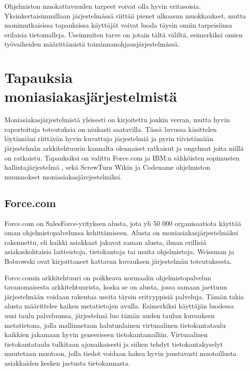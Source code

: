 Ohjelmiston muokattavuuden tarpeet voivat olla hyvin eritasoisia. Yksinkertaisimmillaan järjestelmässä riittää pienet ulkoasun muokkaukset, mutta monimutkaisissa tapauksissa käyttäjät voivat luoda täysin omiin tarpeisiinsa erilaisia tietomalleja. Useimmiten tarve on jotain tältä väliltä, esimerkiksi omien työvaiheiden määrittämistä toiminnanohjausjärjestelmässä.

\chapter{Tapauksia moniasiakasjärjestelmistä}
Moniasiakasjärjestelmistä yleisesti on kirjoitettu jonkin verran, mutta hyvin raportoituja toteutuksia on niukasti saatavilla. Tässä luvussa käsittelen löytämiäni riittävän hyvin kuvattuja järjestelmiä ja pyrin tiivistämään järjestelmän arkkitehtuurin kannalta olennaiset ratkaisut ja ongelmat joita niillä on ratkaistu. Tapauksiksi on valittu Force.com \cite{weissman2009design} ja IBM:n sähköisten sopimusten hallintajärjestelmä \cite{kwok2008software}, sekä ScrewTurn Wikin \cite{bezemer2010challenges} ja Codename ohjelmiston \cite{bezemer2010enabling} muunnokset moniasiakasjärejestelmiksi.


\section{Force.com}
Force.com on SalesForce-yrityksen alusta, jota yli 50 000 organisaatiota käyttää oman ohjelmistopalvelunsa kehittämiseen. Alusta on moniasiakasjärjestelmäksi rakennettu, eli kaikki asiakkaat jakavat saman alusta, ilman erillisiä asiakaskohtaisia laitteistoja, tietokantoja tai muita ohjelmistoja. Weissman ja Bobrowski ovat kirjoittaneet kattavan kuvauksen \cite{weissman2009design} järjestelmän toteutuksesta.

Force.comin arkkitehtuuri on poikkeava normaalin ohjelmistopalvelun tavanomaisesta arkkitehtuurista, koska se on alusta, jossa samaan jaettuun järjestelmään voidaan rakentaa useita täysin erityyppisiä palveluja. Tämän takia alusta määrittelee kaiken metatietojen avulla. Esimerkiksi käyttäjän luodessa uusi taulu palveluunsa, järjestelmä luo tämän uuden taulun kuvauksen metatietona, jolla mallinnetaan halutunlainen virtuaalinen tietokantataulu kaikkien jakamaan hyvin geneeriseen tietokantamalliin. Virtuaalinen tietokantataulu tulkitaan ajonaikaisesti ja siihen tehdyt tietokantakyselyt muutetaan muotoon, jolla tiedot voidaan hakea hyvin joustavasti muotoillusta asiakkaiden kesken jaetusta tietokannasta.

